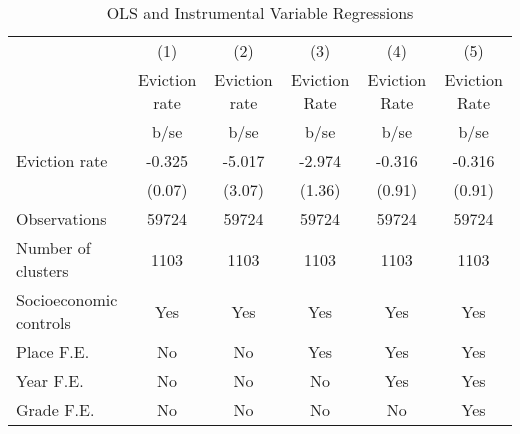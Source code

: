 \begin{table}[htbp]\centering
\def\sym#1{\ifmmode^{#1}\else\(^{#1}\)\fi}
\caption{OLS and Instrumental Variable Regressions}
\begin{tabular}{l*{5}{c}}
\hline\hline
                    &\multicolumn{1}{c}{(1)}&\multicolumn{1}{c}{(2)}&\multicolumn{1}{c}{(3)}&\multicolumn{1}{c}{(4)}&\multicolumn{1}{c}{(5)}\\
                    &Eviction rate&Eviction rate&Eviction Rate&Eviction Rate&Eviction Rate\\
                    &        b/se&        b/se&        b/se&        b/se&        b/se\\
\hline
Eviction rate       &      -0.325&      -5.017&      -2.974&      -0.316&      -0.316\\
                    &      (0.07)&      (3.07)&      (1.36)&      (0.91)&      (0.91)\\
\hline
Observations        &       59724&       59724&       59724&       59724&       59724\\
Number of clusters  &        1103&        1103&        1103&        1103&        1103\\
Socioeconomic controls&         Yes&         Yes&         Yes&         Yes&         Yes\\
Place F.E.          &          No&          No&         Yes&         Yes&         Yes\\
Year F.E.           &          No&          No&          No&         Yes&         Yes\\
Grade F.E.          &          No&          No&          No&          No&         Yes\\
\hline\hline
\end{tabular}
\end{table}
